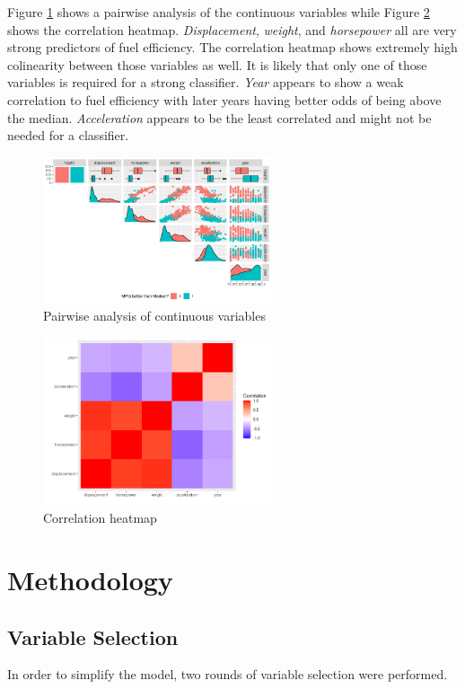 \documentclass[12pt,letterpaper]{article}
\begin{document}
Figure \ref{fig:cont_vars} shows a pairwise analysis of the continuous variables while Figure \ref{fig:cor} shows the correlation heatmap. \textit{Displacement}, \textit{weight}, and \textit{horsepower} all are very strong predictors of fuel efficiency. The correlation heatmap shows extremely high colinearity between those variables as well. It is likely that only one of those variables is required for a strong classifier. \textit{Year} appears to show a weak correlation to fuel efficiency with later years having better odds of being above the median. \textit{Acceleration} appears to be the least correlated and might not be needed for a classifier.

\begin{figure}[!htb]
  \centering
  \includegraphics[width=0.6\textwidth]{cont_pairs}
  \caption{Pairwise analysis of continuous variables}
  \label{fig:cont_vars}
\end{figure}

\begin{figure}[!htb]
  \centering
  \includegraphics[width=0.6\textwidth]{heatmap}
  \caption{Correlation heatmap}
  \label{fig:cor}
\end{figure}

\section*{Methodology}

\subsection*{Variable Selection}
In order to simplify the model, two rounds of variable selection were performed.
\end{document}
